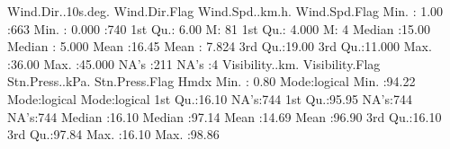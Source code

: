 \documentclass[11pt, a4paper]{article}
\begin{document}
\begin{Schunk}
\begin{Soutput}
 Wind.Dir..10s.deg. Wind.Dir.Flag Wind.Spd..km.h.  Wind.Spd.Flag
 Min.   : 1.00       :663         Min.   : 0.000    :740        
 1st Qu.: 6.00      M: 81         1st Qu.: 4.000   M:  4        
 Median :15.00                    Median : 5.000                
 Mean   :16.45                    Mean   : 7.824                
 3rd Qu.:19.00                    3rd Qu.:11.000                
 Max.   :36.00                    Max.   :45.000                
 NA's   :211                      NA's   :4                     
 Visibility..km. Visibility.Flag Stn.Press..kPa. Stn.Press.Flag   Hmdx        
 Min.   : 0.80   Mode:logical    Min.   :94.22   Mode:logical   Mode:logical  
 1st Qu.:16.10   NA's:744        1st Qu.:95.95   NA's:744       NA's:744      
 Median :16.10                   Median :97.14                                
 Mean   :14.69                   Mean   :96.90                                
 3rd Qu.:16.10                   3rd Qu.:97.84                                
 Max.   :16.10                   Max.   :98.86                                
                                                                              

\end{Soutput}
\end{Schunk}
\end{document}
